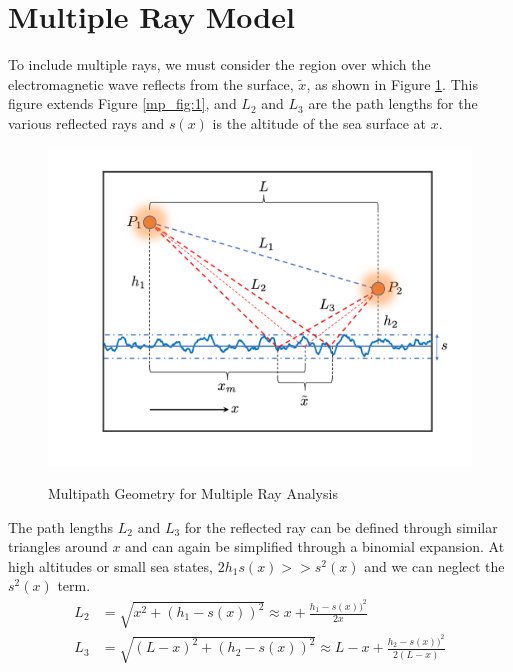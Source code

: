 \section{Multiple Ray Model}
To include multiple rays, we must consider the region over which the electromagnetic wave reflects from the surface, $\tilde{x}$, as shown in Figure \ref{mp_fig:2}. This figure extends Figure \ref{mp_fig:1}, and  $L_2$ and $L_3$ are the path lengths for the various reflected rays and $s(x)$ is the altitude of the sea surface at $x$. 

\begin{figure}[H]
  \begin{center}
\includegraphics[width=5in]{../media/analysis/multipath_layout.png}
  \end{center}
  \renewcommand{\baselinestretch}{1} \small\normalsize
  \begin{quote}
    \caption[Multipath Geometry for Multiple Ray Analysis]{Multipath Geometry for Multiple Ray Analysis\label{mp_fig:2}}
  \end{quote}
\end{figure}
\renewcommand{\baselinestretch}{2} \small\normalsize

The path lengths  $L_2$ and $L_3$ for the reflected ray can be defined through similar triangles around $x$ and can again be simplified through a binomial expansion. At high altitudes or small sea states, $2h_1s(x) >> s^2(x)$ and we can neglect the $s^2(x)$ term.
\begin{equation}
\begin{aligned}
L_2 &= \sqrt{x^2 + \left( h_1 - s(x)\right)^2}  \approx x + \frac{h_1-s(x))^2}{2x}\\
L_3 & = \sqrt{\left(L - x\right)^2 + \left( h_2 - s(x)\right)^2}  \approx L-x + \frac{h_2 - s(x))^2}{2\left(L-x\right)}\\
\end{aligned}
\label{mp_eq:12}
\end{equation}
\renewcommand{\baselinestretch}{2} \small\normalsize

